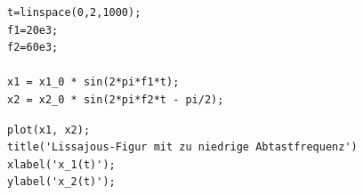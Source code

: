 \begin{sourcecode}
    \caption{Matlab Code zur Signalerzeugung bei zu niedriger Abtastfrequenz}
\begin{verbatim}
t=linspace(0,2,1000);
f1=20e3; 
f2=60e3;

x1 = x1_0 * sin(2*pi*f1*t);
x2 = x2_0 * sin(2*pi*f2*t - pi/2);
\end{verbatim}
\end{sourcecode}

\begin{sourcecode}[htbp]
    \caption{Matlab Code zur Darstellung der verzerrten Lissajous-Figur}
\begin{verbatim}
plot(x1, x2);
title('Lissajous-Figur mit zu niedrige Abtastfrequenz')
xlabel('x_1(t)');
ylabel('x_2(t)');
\end{verbatim}
\end{sourcecode}
